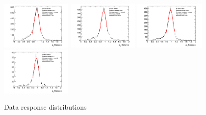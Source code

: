 \begin{figure}[htb!]
    \includegraphics[width=0.31\textwidth]{plots/insitu/fits_data_zee_nominal/Zeejet_Nominal_Bin7.png}
    \includegraphics[width=0.31\textwidth]{plots/insitu/fits_data_zee_nominal/Zeejet_Nominal_Bin8.png}
    \includegraphics[width=0.31\textwidth]{plots/insitu/fits_data_zee_nominal/Zeejet_Nominal_Bin9.png}
    \includegraphics[width=0.31\textwidth]{plots/insitu/fits_data_zee_nominal/Zeejet_Nominal_Bin10.png}
    \caption{Data \zeejet response distributions \label{fig:App:zeedatafits}}
\end{figure}


